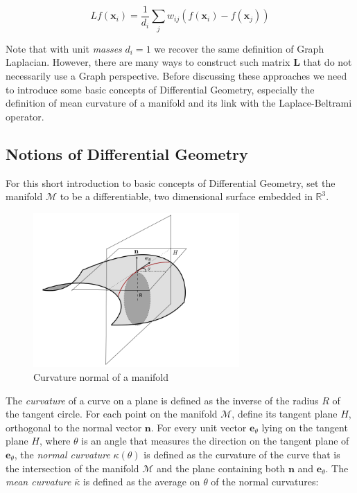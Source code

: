 \begin{equation}\label{eq:discrete laplacian}
	L f\left(\mathbf{x}_{i}\right)=\frac{1}{d_{i}} \sum_{j} w_{i j}\left(f\left(\mathbf{x}_{i}\right)-f\left(\mathbf{x}_{j}\right)\right)
\end{equation}

Note that with unit \textit{masses} $d_i=1$ we recover the same definition of Graph Laplacian. However, there are many ways to construct such matrix $\mathbf L$ that do not necessarily use a Graph perspective. Before discussing these approaches we need to introduce some basic concepts of Differential Geometry, especially the definition of mean curvature of a manifold and its link with the Laplace-Beltrami operator.

\subsection{Notions of Differential Geometry}

 For this short introduction to basic concepts of Differential Geometry, set the manifold $\mathcal M$ to be a differentiable, two dimensional surface embedded in $\mathbb R^3$. 
 \begin{figure}[h]
 	\centering
 	\includegraphics[width=0.7\textwidth]{figs/Chapter3/curvature.png}
 	\caption{\label{fig:curvature}Curvature normal of a manifold}
 \end{figure} 
The \textit{curvature} of a curve on a plane is defined as the inverse of the radius $R$ of the tangent circle. For each point on the manifold $\mathcal M$, define its tangent plane $H$, orthogonal to the normal vector $\mathbf n$. For every unit vector $\mathbf e_\theta$ lying on the tangent plane $H$, where $\theta$ is an angle that measures the direction on the tangent plane of $\mathbf e_\theta$, the \textit{normal curvature} $\kappa(\theta)$ is defined as the curvature of the curve that is the intersection of the manifold $\mathcal M$ and the plane containing both $\mathbf n$ and $\mathbf e_\theta$. The \textit{mean curvature} $\overline \kappa $ is defined as the average on $\theta$ of the normal curvatures:
 
